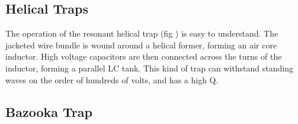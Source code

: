 \subsection{Helical Traps}
The operation of the resonant helical trap (fig \cite{helical_trap}) is easy to understand.  The jacketed wire bundle is
wound around a helical former, forming an air core inductor. High voltage capacitors are then connected across the turns
of the inductor, forming a parallel LC tank. This kind of trap can withstand standing waves on the order of hundreds of
volts, and has a high Q.

\subsection{Bazooka Trap}
